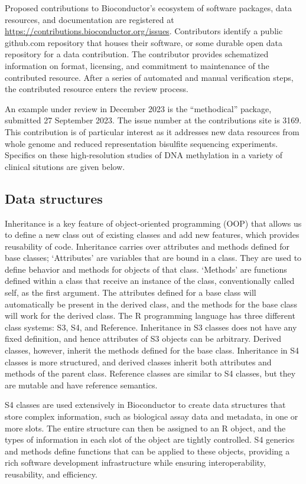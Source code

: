 \documentclass[]{article}
\begin{document}
Proposed contributions to Bioconductor's ecosystem of software packages,
data resources, and documentation are registered at
\url{https://contributions.bioconductor.org/issues}. Contributors
identify a public github.com repository that houses
their software, or some durable open data repository
for a data contribution. The contributor
provides schematized information on format, licensing, and commitment
to maintenance of the contributed resource. After a series of
automated and manual verification steps, the contributed
resource enters the review process.

An example under review in December 2023 is the ``methodical''
package, submitted 27 September 2023. The issue number
at the contributions site is 3169. This contribution is of
particular interest as it addresses new data resources from
whole genome and reduced representation bisulfite sequencing
experiments. Specifics on these high-resolution studies
of DNA methylation
in a variety of clinical situtions are given below.

\hypertarget{data-structures}{%
\subsection{Data structures}\label{data-structures}}

Inheritance is a key feature of object-oriented programming (OOP) that allows us to define a new class out of existing classes and add new features, which provides reusability of code. Inheritance carries over attributes and methods defined for base classes; `Attributes' are variables that are bound in a class. They are used to define behavior and methods for objects of that class. `Methods' are functions defined within a class that receive an instance of the class, conventionally called self, as the first argument. The attributes defined for a base class will automatically be present in the derived class, and the methods for the base class will work for the derived class. The R programming language has three different class systems: S3, S4, and Reference. Inheritance in S3 classes does not have any fixed definition, and hence attributes of S3 objects can be arbitrary. Derived classes, however, inherit the methods defined for the base class. Inheritance in S4 classes is more structured, and derived classes inherit both attributes and methods of the parent class. Reference classes are similar to S4 classes, but they are mutable and have reference semantics.

S4 classes are used extensively in Bioconductor to create data structures that store complex information, such as biological assay data and metadata, in one or more slots. The entire structure can then be assigned to an R object, and the types of information in each slot of the object are tightly controlled. S4 generics and methods define functions that can be applied to these objects, providing a rich software development infrastructure while ensuring interoperability, reusability, and efficiency.
\end{document}
